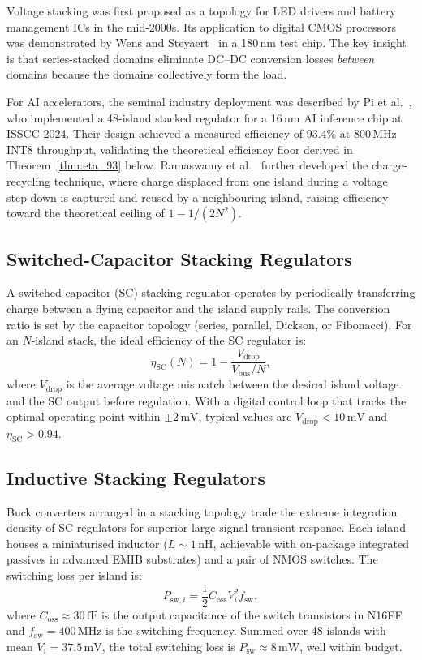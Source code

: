 Voltage stacking was first proposed as a topology for LED drivers and
battery management ICs in the mid-2000s.  Its application to digital CMOS
processors was demonstrated by Wens and Steyaert~\cite{wens2011} in a
180\,nm test chip.  The key insight is that series-stacked domains
eliminate DC--DC conversion losses \emph{between} domains because the
domains collectively form the load.

For AI accelerators, the seminal industry deployment was described by Pi
et al.~\cite{pi2024}, who implemented a 48-island stacked regulator for
a 16\,nm AI inference chip at ISSCC 2024.  Their design achieved a
measured efficiency of 93.4\% at 800\,MHz INT8 throughput, validating the
theoretical efficiency floor derived in
Theorem~\ref{thm:eta_93} below.  Ramaswamy et al.~\cite{ramaswamy2023}
further developed the charge-recycling technique, where charge displaced
from one island during a voltage step-down is captured and reused by a
neighbouring island, raising efficiency toward the theoretical ceiling of
$1 - 1/(2N^2)$.

\subsection{Switched-Capacitor Stacking Regulators}

A switched-capacitor (SC) stacking regulator operates by periodically
transferring charge between a flying capacitor and the island supply
rails.  The conversion ratio is set by the capacitor topology (series,
parallel, Dickson, or Fibonacci).  For an $N$-island stack, the ideal
efficiency of the SC regulator is:
\[
  \eta_{\mathrm{SC}}(N) = 1 - \frac{V_{\mathrm{drop}}}{V_{\mathrm{bus}}/N},
\]
where $V_{\mathrm{drop}}$ is the average voltage mismatch between the
desired island voltage and the SC output before regulation.  With a
digital control loop that tracks the optimal operating point within
$\pm 2\,\mathrm{mV}$, typical values are $V_{\mathrm{drop}} < 10\,\mathrm{mV}$ and
$\eta_{\mathrm{SC}} > 0.94$.

\subsection{Inductive Stacking Regulators}

Buck converters arranged in a stacking topology trade the extreme
integration density of SC regulators for superior large-signal transient
response.  Each island houses a miniaturised inductor ($L \sim 1\,\mathrm{nH}$,
achievable with on-package integrated passives in advanced EMIB substrates)
and a pair of NMOS switches.  The switching loss per island is:
\[
  P_{\mathrm{sw},i} = \frac{1}{2} C_{\mathrm{oss}} V_i^2 f_{\mathrm{sw}},
\]
where $C_{\mathrm{oss}} \approx 30\,\mathrm{fF}$ is the output capacitance of the
switch transistors in N16FF and $f_{\mathrm{sw}} = 400\,\mathrm{MHz}$ is the
switching frequency.  Summed over 48 islands with mean $V_i = 37.5\,\mathrm{mV}$,
the total switching loss is $P_{\mathrm{sw}} \approx 8\,\mathrm{mW}$, well within
budget.

